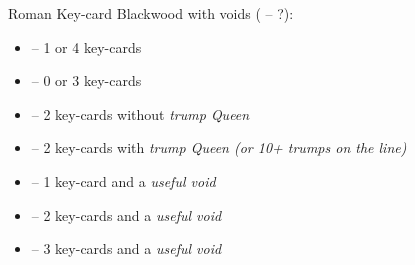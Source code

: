 Roman Key-card Blackwood with voids (\ctr{4\nt} -- ?):
\begin{itemize}
  \item \ctr{5\c} -- 1 or 4 key-cards
  \item \ctr{5\d} -- 0 or 3 key-cards
  \item \ctr{5\h} -- 2 key-cards without \emph{trump Queen}
  \item \ctr{5\s} -- 2 key-cards with \emph{trump Queen (or 10+ trumps on the line)}
  \item \ctr{5\nt} -- 1 key-card and a \emph{useful void}
  \item \ctr{6\c} -- 2 key-cards and a \emph{useful void}
  \item \ctr{6\d} -- 3 key-cards and a \emph{useful void}
\end{itemize}
